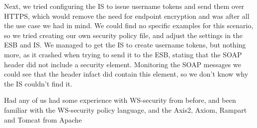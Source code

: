 Next, we tried configuring the IS to issue username tokens and send them over HTTPS, which would remove the need for endpoint encryption and was after all the use case we had in mind. We could find no specific examples for this scenario, so we tried creating our own security policy file, and adjust the settings in the ESB and IS. We managed to get the IS to create username tokens, but nothing more, as it crashed when trying to send it to the ESB, stating that the SOAP header did not include a security element. Monitoring the SOAP messages we could see that the header infact did contain this element, so we don't know why the IS couldn't find it. 



Had any of us had some experience with WS-security from before, and been familiar with the WS-security policy language, and the Axis2, Axiom, Rampart and Tomcat from Apache
